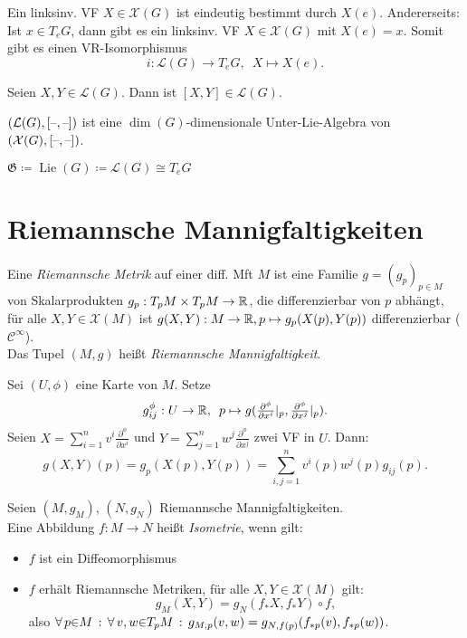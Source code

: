 \documentclass{cheat-sheet}
\newcommand{\coord}[1]{\tfrac{\partial^\phi}{\partial x^{#1}}} %
\newcommand{\Gie}{\mathfrak{G}} %
\DeclareMathOperator{\Lie}{Lie} %
\newcommand{\Cont}{\mathcal{C}} %
\newcommand{\VF}{\mathcal{X}} %
\begin{document}
\begin{bem}
  Ein linksinv. VF $X \!\in\! \VF(G)$ ist eindeutig bestimmt durch $X(e)$.
  Andererseits: Ist $x \in T_e G$, dann gibt es ein linksinv. VF $X \in \VF(G)$ mit $X(e) = x$.
  Somit gibt es einen VR-Isomorphismus
  \[
    i : \mathcal{L}(G) \to T_e G, \enspace
    X \mapsto X(e).
  \]
\end{bem}

\begin{lem}
  Seien $X, Y \in \mathcal{L}(G)$. Dann ist $[X, Y] \in \mathcal{L}(G)$.
\end{lem}

\begin{kor}
  $(\mathcal{L}(G), [\text{--},\text{--}])$ ist eine $\dim(G)$-dimensionale Unter-Lie-Algebra von $(\VF(G), [\blank,\blank])$.
\end{kor}

\begin{nota}
  $\Gie \coloneqq \Lie(G) \coloneqq \mathcal{L}(G) \cong T_e G$
\end{nota}

\section{Riemannsche Mannigfaltigkeiten}

\begin{defn}
  Eine \emph{Riemannsche Metrik} auf einer diff. Mft $M$ ist eine Familie $g = (g_p)_{p \in M}$ von Skalarprodukten $g_p : T_p M \times T_p M \to \mathbb{R}$, die differenzierbar von $p$ abhängt, \dh{} für alle $X, Y \in \VF(M)$ ist $g(X, Y) : M \to \mathbb{R}, p \mapsto g_p(X(p), Y(p))$ differenzierbar ($\Cont^\infty$).\\
  Das Tupel $(M, g)$ heißt \emph{Riemannsche Mannigfaltigkeit}.
\end{defn}

\begin{bem}
  Sei $(U, \phi)$ eine Karte von $M$. Setze
  \[
    g_{ij}^{\phi} : U \to \R, \enspace
    p \mapsto g(\coord{i}|_p, \coord{j}|_p).
  \]
  Seien $X = {\sum}_{i=1}^n v^i \coord{i}$ und $Y = {\sum}_{j=1}^n w^j \coord{j}$ zwei VF in $U$.
  Dann:
  \[
    g(X, Y)(p) = g_p(X(p), Y(p)) = \sum_{i,j=1}^n v^i(p) w^j(p) g_{ij}(p).
  \]
\end{bem}

\begin{defn}
  Seien $(M, g_M)$, $(N, g_N)$ Riemannsche Mannigfaltigkeiten. \\
  Eine Abbildung $f : M \to N$ heißt \emph{Isometrie}, wenn gilt:
  \begin{itemize}
    \item $f$ ist ein Diffeomorphismus
    \item $f$ erhält Riemannsche Metriken, \dh{} für alle $X, Y \in \VF(M)$ gilt:
    \[ g_M(X, Y) = g_N(f_* X, f_* Y) \circ f, \]
    also $\forall \, {p {\in} M} \,:\, \forall \, {v, w {\in} T_p M} \,:\, g_{M,p} (v, w) = g_{N,f(p)}(f_{*p}(v), f_{*p}(w))$.
  \end{itemize}
\end{defn}
\end{document}
